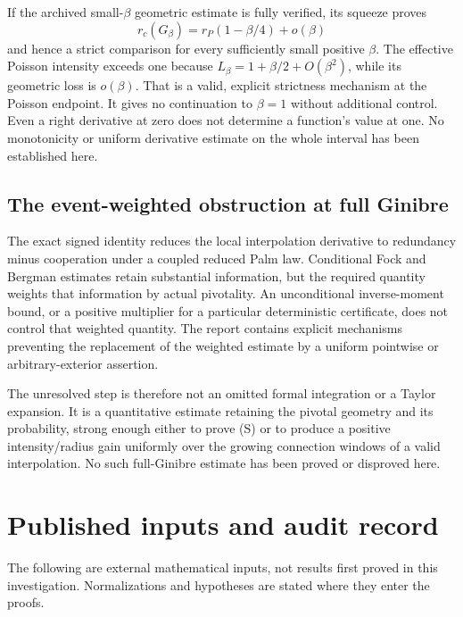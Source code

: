 \documentclass[11pt,a4paper]{article}
\theoremstyle{definition}
\theoremstyle{remark}
\numberwithin{equation}{section}
\begin{document}
If the archived small-\(\beta\) geometric estimate is fully verified, its
squeeze proves
\[
 r_c(G_\beta)=r_P(1-\beta/4)+o(\beta)
\]
and hence a strict comparison for every sufficiently small positive
\(\beta\). The effective Poisson intensity exceeds one because
\(L_\beta=1+\beta/2+O(\beta^2)\), while its geometric loss is
\(o(\beta)\). That is a valid, explicit strictness mechanism at the
Poisson endpoint. It gives no continuation to \(\beta=1\) without
additional control. Even a right derivative at zero does not determine
a function's value at one. No monotonicity or uniform derivative estimate
on the whole interval has been established here.

\subsection{The event-weighted obstruction at full Ginibre}
The exact signed identity reduces the local interpolation derivative to
redundancy minus cooperation under a coupled reduced Palm law. Conditional
Fock and Bergman estimates retain substantial information, but the required
quantity weights that information by actual pivotality. An unconditional
inverse-moment bound, or a positive multiplier for a particular deterministic
certificate, does not control that weighted quantity. The report contains
explicit mechanisms preventing the replacement of the weighted estimate
by a uniform pointwise or arbitrary-exterior assertion.

The unresolved step is therefore not an omitted formal integration or a
Taylor expansion. It is a quantitative estimate retaining the pivotal
geometry and its probability, strong enough either to prove (S) or to
produce a positive intensity/radius gain uniformly over the growing
connection windows of a valid interpolation. No such full-Ginibre estimate
has been proved or disproved here.

\section{Published inputs and audit record}
\label{sec:inputs}

The following are external mathematical inputs, not results first proved
in this investigation. Normalizations and hypotheses are stated where
they enter the proofs.
\end{document}

